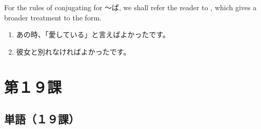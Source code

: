 \documentclass[notoc,notitlepage]{tufte-book}
\begin{document}
\begin{note}
  For the rules of conjugating for 〜ば, we shall refer the reader to
  , which gives a broader treatment to the form.
\end{note}

\begin{eg}
  \begin{enumerate}
    \item あの時、「愛している」と言えばよかったです。
    \item 彼女と別れなければよかったです。
  \end{enumerate}
\end{eg}



\chapter{第１９課}%
\label{chp:dai_19_ka}

\section{単語（１９課）}%
\label{sec:tango_c19}
\end{document}
